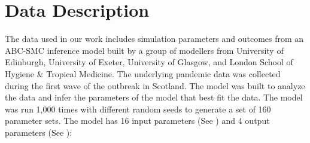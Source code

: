 \section{Data Description}
\label{sec:Data}

The data used in our work includes simulation parameters and outcomes from an ABC-SMC inference model \cite{toni2008Approximate} built by a group of modellers from University of Edinburgh, University of Exeter, University of Glasgow, and London School of Hygiene \& Tropical Medicine. The underlying pandemic data was collected during the first wave of the outbreak in Scotland. The model was built to analyze the data and infer the parameters of the model that best fit the data. The model was run 1,000 times with different random seeds to generate a set of 160 parameter sets. The model has 16 input parameters (See ) and 4 output parameters (See ):

